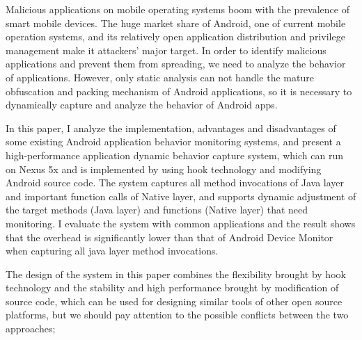 

\begin{enabstract}
Malicious applications on mobile operating systems boom with the prevalence of smart mobile devices. The huge market share of Android, one of current mobile operation systems, and its relatively open application distribution and privilege management make it attackers' major target. In order to identify malicious applications and prevent them from spreading, we need to analyze the behavior of applications. However,  only static analysis can not handle the mature obfuscation and packing mechanism of Android applications, so it is necessary to dynamically capture and analyze the behavior of Android apps.

In this paper, I analyze the implementation, advantages and disadvantages of some existing Android application behavior monitoring systems, and present a high-performance application dynamic behavior capture system, which can run on Nexus 5x and is implemented by using hook technology and modifying Android source code. The system captures all method invocations of Java layer and important function calls of Native layer, and supports dynamic adjustment of the target methods (Java layer) and functions (Native layer) that need monitoring. I evaluate the system with common applications and the result shows that the overhead is significantly lower than that of Android Device Monitor when capturing all java layer method invocations.

The design of the system in ​​this paper combines the flexibility brought by hook technology and the stability and high performance brought by modification of source code, which can be used for designing similar tools of other open source platforms, but we should pay attention to the possible conflicts between the two approaches;

\end{enabstract}
\par
\vspace*{2em}

